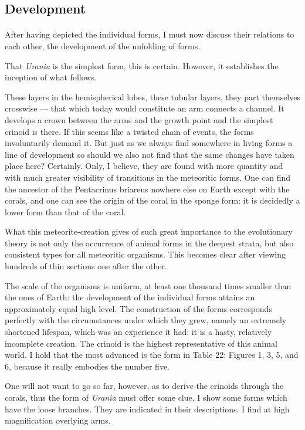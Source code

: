 \documentclass[a4paper, 12pt, oneside]{article}
\begin{document}
\subsection{Development}
\paragraph{}
After having depicted the individual forms, I must now discuss their relations to each other, the development of the unfolding of forms.

That \emph{Urania} is the simplest form, this is certain. However, it establishes the inception of what follows.

These layers in the hemispherical lobes, these tubular layers, they part themselves crosswise — that which today would constitute an arm connects a channel. It develops a crown between the arms and the growth point and the simplest crinoid is there. If this seems like a twisted chain of events, the forms involuntarily demand it. But just as we always find somewhere in living forms a line of development so should we also not find that the same changes have taken place here? Certainly. Only, I believe, they are found with more quantity and with much greater visibility of transitions in the meteoritic forms. One can find the ancestor of the Pentacrinus briareus nowhere else on Earth except with the corals, and one can see the origin of the coral in the sponge form: it is decidedly a lower form than that of the coral.

What this meteorite-creation gives of such great importance to the evolutionary theory is not only the occurrence of animal forms in the deepest strata, but also consistent types for all meteoritic organisms. This becomes clear after viewing hundreds of thin sections one after the other.

The scale of the organisms is uniform, at least one thousand times smaller than the ones of Earth: the development of the individual forms attains an approximately equal high level. The construction of the forms corresponds perfectly with the circumstances under which they grew, namely an extremely shortened lifespan, which was an experience it had: it is a hasty, relatively incomplete creation. The crinoid is the highest representative of this animal world. I hold that the most advanced is the form in Table 22: Figures 1, 3, 5, and 6, because it really embodies the number five.

One will not want to go so far, however, as to derive the crinoids through the corals, thus the form of \emph{Urania} must offer some clue. I show some forms which have the loose branches. They are indicated in their descriptions. I find at high magnification overlying arms.
\end{document}
